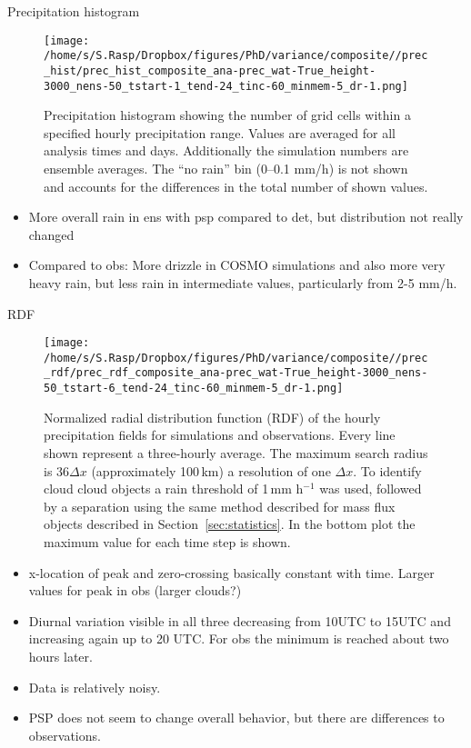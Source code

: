 \documentclass[a4paper, 12pt]{article}
\begin{document}
\newpage
Precipitation histogram
\begin{figure}[h!]
\noindent \centering
\texttt{[image: /home/s/S.Rasp/Dropbox/figures/PhD/variance/composite//prec\_hist/prec\_hist\_composite\_ana-prec\_wat-True\_height-3000\_nens-50\_tstart-1\_tend-24\_tinc-60\_minmem-5\_dr-1.png]}\\
\caption{Precipitation histogram showing the number of grid cells within a specified hourly precipitation range. Values are averaged for all analysis times and days. Additionally the simulation numbers are ensemble averages. The ``no rain'' bin (0--0.1 mm/h) is not shown and accounts for the differences in the total number of shown values.} \label{fig:prec_hist}
\end{figure}
\begin{itemize}
 \item More overall rain in ens with psp compared to det, but distribution not really changed
 \item Compared to obs: More drizzle in COSMO simulations and also more very heavy rain, but less rain in intermediate values, particularly from 2-5 mm/h. 
\end{itemize}


\newpage
RDF
\begin{figure}[h!]
\noindent \centering
\texttt{[image: /home/s/S.Rasp/Dropbox/figures/PhD/variance/composite//prec\_rdf/prec\_rdf\_composite\_ana-prec\_wat-True\_height-3000\_nens-50\_tstart-6\_tend-24\_tinc-60\_minmem-5\_dr-1.png]}\\
\caption{Normalized radial distribution function (RDF) of the hourly precipitation fields for simulations and observations. Every line shown represent a three-hourly average. The maximum search radius is 36$\Delta x$ (approximately 100\,km) a resolution of one $\Delta x$. To identify cloud cloud objects a rain threshold of 1\,mm h$^{-1}$ was used, followed by a separation using the same method described for mass flux objects described in Section~\ref{sec:statistics}. In the bottom plot the maximum value for each time step is shown.} \label{fig:prec_rdf}
\end{figure}
\begin{itemize}
 \item x-location of peak and zero-crossing basically constant with time. Larger values for peak in obs (larger clouds?)
 \item Diurnal variation visible in all three decreasing from 10UTC to 15UTC and increasing again up to 20 UTC. For obs the minimum is reached about two hours later. 
 \item Data is relatively noisy. 
 \item PSP does not seem to change overall behavior, but there are differences to observations. 
\end{itemize}
\end{document}
